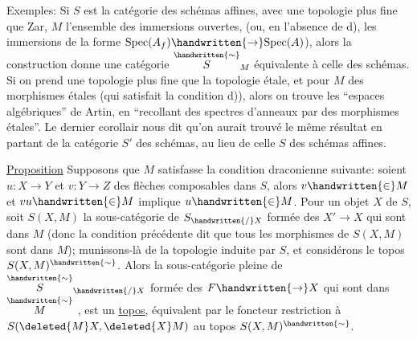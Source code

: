 Exemples: Si $S$ est la catégorie des schémas affines, avec une topologie plus fine que Zar, $M$ l'ensemble des immersions ouvertes,  (ou, en l'absence de d), les immersions de la forme $\mathrm{Spec}(A_f)\handwritten{\to}\mathrm{Spec}(A)$), alors la construction donne une catégorie $\overset{\handwritten{\sim}}{S}_M$ équivalente à celle des schémas. Si on prend une topologie plus fine que la topologie étale, et pour $M$  des morphismes étales (qui satisfait la condition d)), alors on trouve les ``espaces algébriques'' de Artin, en ``recollant des spectres d'anneaux  par des morphismes étales''. Le dernier corollair nous dit qu'on aurait trouvé le même résultat en partant de la catégorie $S'$ des schémas, au lieu de celle $S$ des schémas affines. \handwritten{Dans ce cas, les morphismes de $\widetilde M$ sont dits \uline{étales} [la top. sur $S$ étant la top. étale). \deleted{\illegible{1}}}

\uline{Proposition} \quad Supposons que $M$ satisfasse la condition draconienne suivante: soient $u:X\to Y$ et $v:Y\to Z$ des flèches composables dans $S$,  alors $v\handwritten{\in} M$ et $vu\handwritten{\in} M$ implique $u\handwritten{\in} M$. Pour un objet $X$ de $S$, soit $S(X,M)$ la sous-catégorie de $S_{\handwritten{/}X}$  formée des $X'\to X$ qui sont dans $M$ (donc la condition précédente dit que tous les morphismes de $S(X,M)$ sont dans $M$); munissons-là de la topologie induite par $S$, et considérons le topos $S(X,M)^{\handwritten{\sim}}$. Alors 
 la sous-catégorie pleine de $\overset{\handwritten{\sim}}{S}_{\handwritten{/}X}$ formée des $F\handwritten{\to}X$ qui sont dans $\overset{\handwritten{\sim}}{M}$ , est  un \uline{topos}, équivalent par le foncteur restriction à $S(\deleted{M}X,\deleted{X}M)$ au topos $S(X,M)^{\handwritten{\sim}}$.


